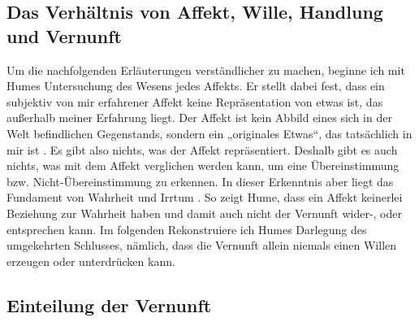 \documentclass[ngerman,12pt]{diazessay} %
\begin{document}
\begin{doublespace}

\section{Das Verhältnis von Affekt, Wille, Handlung und Vernunft}

Um die nachfolgenden Erläuterungen verständlicher zu machen, beginne ich mit Humes Untersuchung des Wesens jedes Affekts. Er stellt dabei fest, dass ein subjektiv von mir erfahrener Affekt keine Repräsentation von etwas ist, das außerhalb meiner Erfahrung liegt. Der Affekt ist kein Abbild eines sich in der Welt befindlichen Gegenstands, sondern ein „originales Etwas“, das tatsächlich in mir ist \cite[siehe S.486]{Hume.2013}. Es gibt also nichts, was der Affekt repräsentiert. Deshalb gibt es auch nichts, was mit dem Affekt verglichen werden kann, um eine Übereinstimmung bzw. Nicht-Übereinstimmung zu erkennen. In dieser Erkenntnis aber liegt das Fundament von Wahrheit und Irrtum \cite[siehe S.534]{Hume.2013}. So zeigt Hume, dass ein Affekt keinerlei Beziehung zur Wahrheit haben und damit auch nicht der Vernunft wider-, oder entsprechen kann. Im folgenden Rekonstruiere ich Humes Darlegung des umgekehrten Schlusses, nämlich, dass die Vernunft allein niemals einen Willen erzeugen oder unterdrücken kann.

\subsection{Einteilung der Vernunft}


\end{doublespace}
\end{document}
